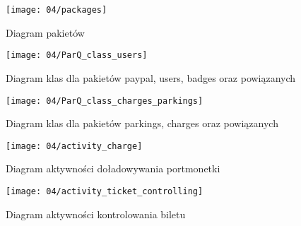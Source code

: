


\begin{figure}[p]
	\begin{center}
		\texttt{[image: 04/packages]}
	\end{center}
	\caption{Diagram pakietów}
\end{figure}




\begin{figure}[p]
	\begin{center}
		\texttt{[image: 04/ParQ\_class\_users]}
	\end{center}
	\caption{Diagram klas dla pakietów paypal, users, badges oraz powiązanych}
\end{figure}


\begin{figure}[p]
	\begin{center}
		\texttt{[image: 04/ParQ\_class\_charges\_parkings]}
	\end{center}
	\caption{Diagram klas dla pakietów parkings, charges oraz powiązanych}
\end{figure}



\begin{figure}[p]
	\begin{center}
		\texttt{[image: 04/activity\_charge]}
	\end{center}
	\caption{Diagram aktywności doładowywania portmonetki}
\end{figure}

\begin{figure}[p]
	\begin{center}
		\texttt{[image: 04/activity\_ticket\_controlling]}
	\end{center}
	\caption{Diagram aktywności kontrolowania biletu}
\end{figure}

